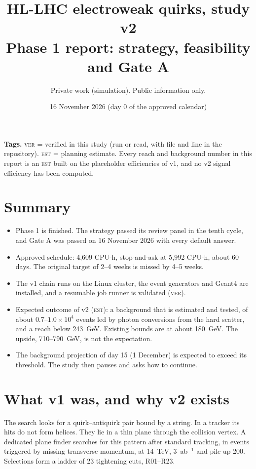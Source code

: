 \documentclass[11pt,a4paper]{article}
\title{HL-LHC electroweak quirks, study v2\\[2pt]\large Phase 1 report: strategy, feasibility and Gate A}
\author{Private work (simulation). Public information only.}
\date{16 November 2026 (day 0 of the approved calendar)}
\newcommand{\est}{\textsc{est}}
\newcommand{\ver}{\textsc{ver}}
\begin{document}
\maketitle

\noindent\textbf{Tags.} \ver{} = verified in this study (run or read, with file and line in the repository).
\est{} = planning estimate. Every reach and background number in this report is an \est{} built on the placeholder
efficiencies of v1, and no v2 signal efficiency has been computed.

\section{Summary}
\begin{itemize}
\item Phase 1 is finished. The strategy passed its review panel in the tenth cycle, and Gate A was passed on
      16 November 2026 with every default answer.
\item Approved schedule: 4{,}609 CPU-h, stop-and-ask at 5{,}992 CPU-h, about 60 days. The original target of
      2--4 weeks is missed by 4--5 weeks.
\item The v1 chain runs on the Linux cluster, the event generators and Geant4 are installed, and a resumable job
      runner is validated (\ver).
\item Expected outcome of v2 (\est): a background that is estimated and tested, of about
      $0.7$--$1.0\times10^{4}$ events led by photon conversions from the hard scatter, and a reach below 243~GeV.
      Existing bounds are at about 180~GeV. The upside, 710--790~GeV, is not the expectation.
\item The background projection of day 15 (1 December) is expected to exceed its threshold. The study then
      pauses and asks how to continue.
\end{itemize}

\section{What v1 was, and why v2 exists}
The search looks for a quirk--antiquirk pair bound by a string. In a tracker its hits do not form helices. They lie
in a thin plane through the collision vertex. A dedicated plane finder searches for this pattern after standard
tracking, in events triggered by missing transverse momentum, at 14~TeV, 3~ab$^{-1}$ and pile-up 200. Selections
form a ladder of 23 tightening cuts, R01--R23.
\end{document}
